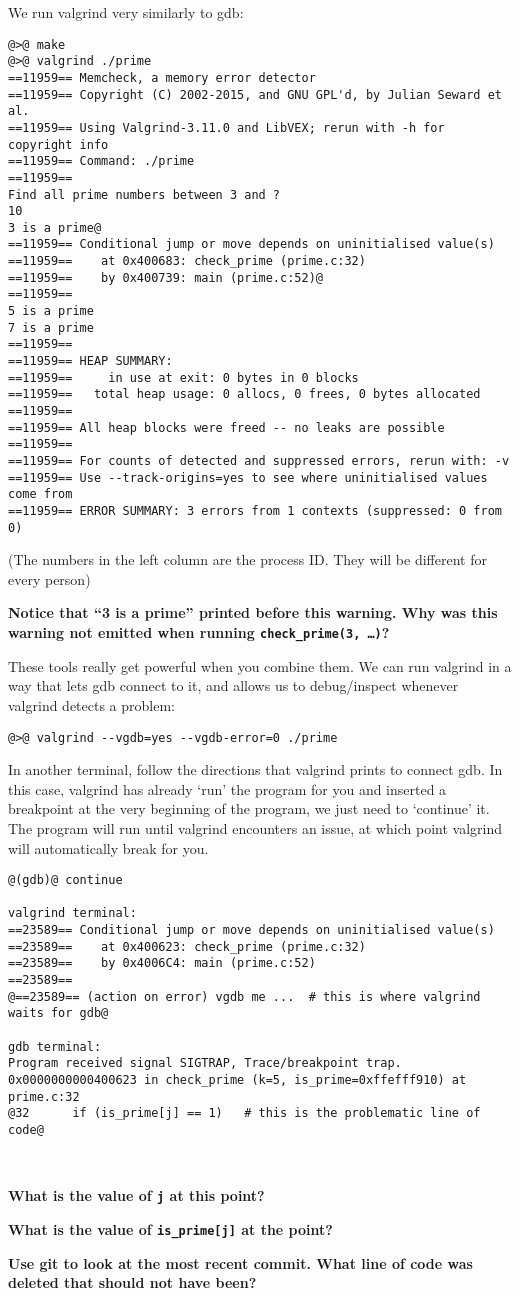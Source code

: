 \documentclass{article}
\begin{document}
We run valgrind very similarly to gdb:
\begin{lstlisting}
@>@ make
@>@ valgrind ./prime
==11959== Memcheck, a memory error detector
==11959== Copyright (C) 2002-2015, and GNU GPL'd, by Julian Seward et al.
==11959== Using Valgrind-3.11.0 and LibVEX; rerun with -h for copyright info
==11959== Command: ./prime
==11959== 
Find all prime numbers between 3 and ?
10
3 is a prime@
==11959== Conditional jump or move depends on uninitialised value(s)
==11959==    at 0x400683: check_prime (prime.c:32)
==11959==    by 0x400739: main (prime.c:52)@
==11959== 
5 is a prime
7 is a prime
==11959== 
==11959== HEAP SUMMARY:
==11959==     in use at exit: 0 bytes in 0 blocks
==11959==   total heap usage: 0 allocs, 0 frees, 0 bytes allocated
==11959== 
==11959== All heap blocks were freed -- no leaks are possible
==11959== 
==11959== For counts of detected and suppressed errors, rerun with: -v
==11959== Use --track-origins=yes to see where uninitialised values come from
==11959== ERROR SUMMARY: 3 errors from 1 contexts (suppressed: 0 from 0)
\end{lstlisting}
{\small (The numbers in the left column are the process ID. They will be
  different for every person)}

\newpage
\textbf{Notice that ``3 is a prime'' printed before this warning. Why was this
  warning not emitted when running \texttt{check\_prime(3,~\dots)}?}
\vspace{2cm}

These tools really get powerful when you combine them. We can run valgrind in
a way that lets gdb connect to it, and allows us to debug/inspect whenever
valgrind detects a problem:
\begin{lstlisting}
@>@ valgrind --vgdb=yes --vgdb-error=0 ./prime
\end{lstlisting}
In another terminal, follow the directions that valgrind prints to connect
gdb. In this case, valgrind has already `run' the program for you and inserted
a breakpoint at the very beginning of the program, we just need to `continue'
it. The program will run until valgrind encounters an issue, at which point
valgrind will automatically break for you.
\begin{lstlisting}
@(gdb)@ continue

valgrind terminal:
==23589== Conditional jump or move depends on uninitialised value(s)
==23589==    at 0x400623: check_prime (prime.c:32)
==23589==    by 0x4006C4: main (prime.c:52)
==23589== 
@==23589== (action on error) vgdb me ...  # this is where valgrind waits for gdb@

gdb terminal:
Program received signal SIGTRAP, Trace/breakpoint trap.
0x0000000000400623 in check_prime (k=5, is_prime=0xffefff910) at prime.c:32
@32      if (is_prime[j] == 1)   # this is the problematic line of code@
\end{lstlisting}

~

\textbf{What is the value of \texttt{j} at this point?}\\
\vspace{1cm}

\textbf{What is the value of \texttt{is\_prime[j]} at the point?}\\
\vspace{1cm}

\textbf{Use git to look at the most recent commit. What line of code was
  deleted that should not have been?}
\end{document}
